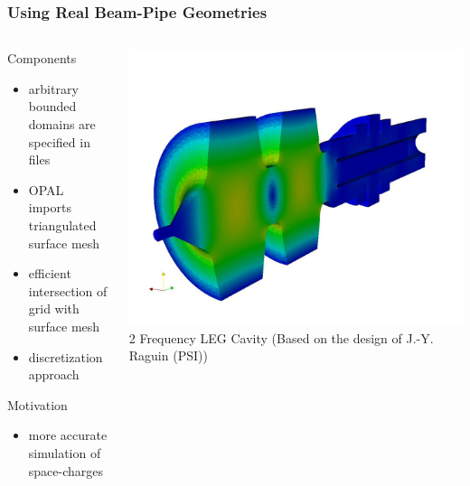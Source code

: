 \documentclass[xcolor=pdftex,table,10pt]{beamer}
\newcommand{\opal}{\textsc{OPAL }}
\begin{document}
	\begin{frame}
		\frametitle{Using Real Beam-Pipe Geometries}

		\begin{columns}
		\begin{column}{5cm}
			\begin{exampleblock}{Components}
			\begin{itemize}
				\item arbitrary bounded domains are specified in files
				\item \opal imports triangulated surface mesh
				\item efficient intersection of grid with surface mesh
				\item discretization approach
			\end{itemize}
			\end{exampleblock}
			\begin{block}{Motivation}
			\begin{itemize}
				\item more accurate simulation of space-charges
			\end{itemize}
			\end{block}
		\end{column}
		\begin{column}{5cm}
			\includegraphics[width=1.0\textwidth]{electric_field_mode_4_ohne_symmetrie_v5qmm.jpg} \\
			\scriptsize{2 Frequency LEG Cavity (Based on the design of  J.-Y. Raguin (PSI))}
		\end{column}
		\end{columns}

	\end{frame}
    	
\end{document}
